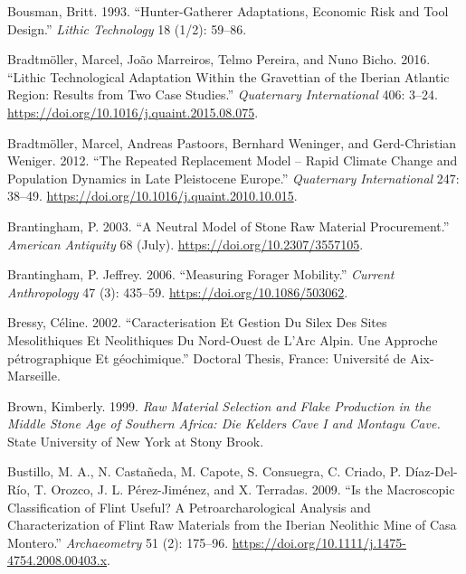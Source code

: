 \documentclass[
  a4paper,
  DIV=11,
  numbers=noendperiod]{scrreprt}
\newlength{\cslhangindent}
\newenvironment{CSLReferences}[2] %
 {\begin{list}{}{%
  \setlength{\itemindent}{0pt}
  \setlength{\leftmargin}{0pt}
  \setlength{\parsep}{0pt}
  \ifodd #1
   \setlength{\leftmargin}{\cslhangindent}
   \setlength{\itemindent}{-1\cslhangindent}
  \fi
  \setlength{\itemsep}{#2\baselineskip}}}
 {\end{list}}
\begin{document}
\begin{CSLReferences}{1}{0}
Bousman, Britt. 1993. {``Hunter-Gatherer Adaptations, Economic Risk and
Tool Design.''} \emph{Lithic Technology} 18 (1/2): 59--86.

Bradtmöller, Marcel, João Marreiros, Telmo Pereira, and Nuno Bicho.
2016. {``Lithic Technological Adaptation Within the {Gravettian} of the
{Iberian Atlantic} Region: {Results} from Two Case Studies.''}
\emph{Quaternary International} 406: 3--24.
\url{https://doi.org/10.1016/j.quaint.2015.08.075}.

Bradtmöller, Marcel, Andreas Pastoors, Bernhard Weninger, and
Gerd-Christian Weniger. 2012. {``The Repeated Replacement Model --
{Rapid} Climate Change and Population Dynamics in {Late Pleistocene
Europe}.''} \emph{Quaternary International} 247: 38--49.
\url{https://doi.org/10.1016/j.quaint.2010.10.015}.

Brantingham, P. 2003. {``A {Neutral Model} of {Stone Raw Material
Procurement}.''} \emph{American Antiquity} 68 (July).
\url{https://doi.org/10.2307/3557105}.

Brantingham, P. Jeffrey. 2006. {``Measuring {Forager Mobility}.''}
\emph{Current Anthropology} 47 (3): 435--59.
\url{https://doi.org/10.1086/503062}.

Bressy, Céline. 2002. {``Caracterisation Et Gestion Du Silex Des Sites
Mesolithiques Et Neolithiques Du {Nord-Ouest} de {L}'{Arc Alpin}. {Une}
Approche p{é}trographique Et g{é}ochimique.''} Doctoral Thesis, France:
Universit{é} de Aix-Marseille.

Brown, Kimberly. 1999. \emph{Raw Material Selection and Flake Production
in the {Middle Stone Age} of {Southern Africa}: {Die Kelders Cave I} and
{Montagu Cave}.} State University of New York at Stony Brook.

Bustillo, M. A., N. Castañeda, M. Capote, S. Consuegra, C. Criado, P.
Díaz-Del-Río, T. Orozco, J. L. Pérez-Jiménez, and X. Terradas. 2009.
{``Is the Macroscopic Classification of Flint Useful? {A}
Petroarcharological Analysis and Characterization of Flint Raw Materials
from the {Iberian} Neolithic Mine of {Casa Montero}.''}
\emph{Archaeometry} 51 (2): 175--96.
\url{https://doi.org/10.1111/j.1475-4754.2008.00403.x}.


\end{CSLReferences}
\end{document}
